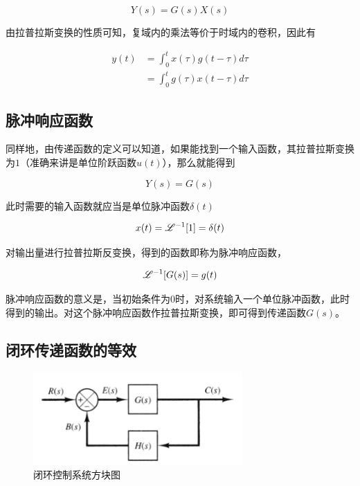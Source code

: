 \begin{equation*}
Y(s)=G(s)X(s)
\end{equation*}

由拉普拉斯变换的性质可知，复域内的乘法等价于时域内的卷积，因此有

\begin{align*}
y(t)&=\int_0^tx(\tau)g(t-\tau)d\tau\\
&=\int_0^tg(\tau)x(t-\tau)d\tau
\end{align*}

\subsection{脉冲响应函数}

同样地，由传递函数的定义可以知道，如果能找到一个输入函数，其拉普拉斯变换为$1$（准确来讲是单位阶跃函数$u(t)$），那么就能得到

\begin{equation*}
Y(s)=G(s)
\end{equation*}

此时需要的输入函数就应当是单位脉冲函数$\delta(t)$

\begin{equation*}
x(t)=\mathscr{L}^{-1}[1]=\delta(t)
\end{equation*}

对输出量进行拉普拉斯反变换，得到的函数即称为脉冲响应函数，


\begin{equation*}
\mathscr{L}^{-1}[G(s)]=g(t)
\end{equation*}

脉冲响应函数的意义是，当初始条件为$0$时，对系统输入一个单位脉冲函数，此时得到的输出。对这个脉冲响应函数作拉普拉斯变换，即可得到传递函数$G(s)$。

\subsection{闭环传递函数的等效}


\begin{figure}[!ht]
	\centering
	\includegraphics[width=8cm]{figures/2.png}
	\caption{闭环控制系统方块图}
	\label{2}
\end{figure}



